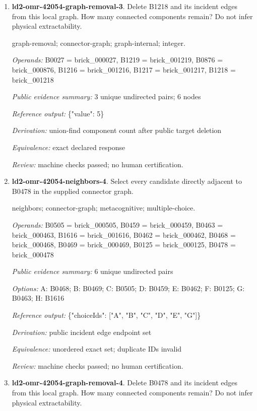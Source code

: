 \begin{enumerate}
\item \textbf{ld2-omr-42054-graph-removal-3}. Delete B1218 and its incident edges from this local graph. How many connected components remain? Do not infer physical extractability.
\par{\small graph-removal; connector-graph; graph-internal; integer.\par\textit{Operands:} B0027 = brick\_000027, B1219 = brick\_001219, B0876 = brick\_000876, B1216 = brick\_001216, B1217 = brick\_001217, B1218 = brick\_001218\par\textit{Public evidence summary:} 3 unique undirected pairs; 6 nodes\par\textit{Reference output:} \{"value": 5\}\par\textit{Derivation:} union-find component count after public target deletion\par\textit{Equivalence:} exact declared response\par\textit{Review:} machine checks passed; no human certification.}
\item \textbf{ld2-omr-42054-neighbors-4}. Select every candidate directly adjacent to B0478 in the supplied connector graph.
\par{\small neighbors; connector-graph; metacognitive; multiple-choice.\par\textit{Operands:} B0505 = brick\_000505, B0459 = brick\_000459, B0463 = brick\_000463, B1616 = brick\_001616, B0462 = brick\_000462, B0468 = brick\_000468, B0469 = brick\_000469, B0125 = brick\_000125, B0478 = brick\_000478\par\textit{Public evidence summary:} 6 unique undirected pairs\par\textit{Options:} A: B0468; B: B0469; C: B0505; D: B0459; E: B0462; F: B0125; G: B0463; H: B1616\par\textit{Reference output:} \{"choiceIds": ["A", "B", "C", "D", "E", "G"]\}\par\textit{Derivation:} public incident edge endpoint set\par\textit{Equivalence:} unordered exact set; duplicate IDs invalid\par\textit{Review:} machine checks passed; no human certification.}
\item \textbf{ld2-omr-42054-graph-removal-4}. Delete B0478 and its incident edges from this local graph. How many connected components remain? Do not infer physical extractability.

\end{enumerate}
